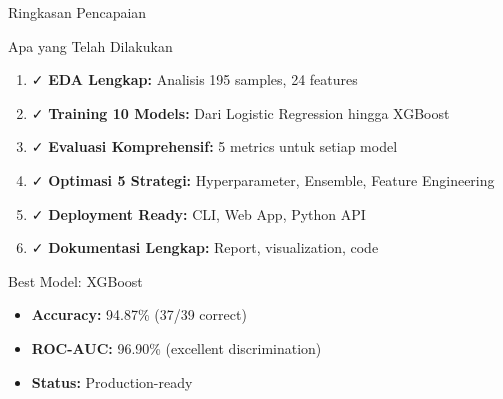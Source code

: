 \documentclass[aspectratio=169]{beamer}
\begin{document}
\begin{frame}{Ringkasan Pencapaian}
\begin{block}{Apa yang Telah Dilakukan}
\begin{enumerate}
    \item ✓ \textbf{EDA Lengkap:} Analisis 195 samples, 24 features
    \item ✓ \textbf{Training 10 Models:} Dari Logistic Regression hingga XGBoost
    \item ✓ \textbf{Evaluasi Komprehensif:} 5 metrics untuk setiap model
    \item ✓ \textbf{Optimasi 5 Strategi:} Hyperparameter, Ensemble, Feature Engineering
    \item ✓ \textbf{Deployment Ready:} CLI, Web App, Python API
    \item ✓ \textbf{Dokumentasi Lengkap:} Report, visualization, code
\end{enumerate}
\end{block}

\begin{block}{Best Model: XGBoost}
\begin{itemize}
    \item \textbf{Accuracy:} 94.87\% (37/39 correct)
    \item \textbf{ROC-AUC:} 96.90\% (excellent discrimination)
    \item \textbf{Status:} Production-ready
\end{itemize}
\end{block}
\end{frame}
\end{document}
